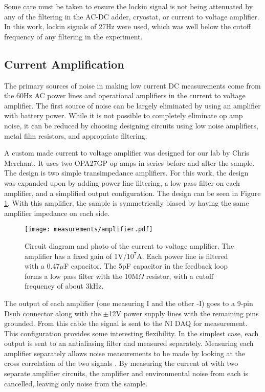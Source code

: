 Some care must be taken to ensure the lockin signal is not being attenuated by any of the filtering in the AC-DC adder, cryostat, or current to voltage amplifier.  In this work, lockin signals of 27Hz were used, which was well below the cutoff frequency of any filtering in the experiment.

\subsection{Current Amplification}
\label{sec:CV_amp}

The primary sources of noise in making low current DC measurements come from the 60Hz AC power lines and operational amplifiers in the current to voltage amplifier. The first source of noise can be largely eliminated by using an amplifier with battery power. While it is not possible to completely eliminate op amp noise, it can be reduced by choosing designing circuits using low noise amplifiers, metal film resistors, and appropriate filtering. 

A custom made current to voltage amplifier was designed for our lab by Chris Merchant. It uses two OPA27GP op amps in series before and after the sample. The design is two simple transimpedance amplifiers. For this work, the design was expanded upon by adding power line filtering, a low pass filter on each amplifier, and a simplified output configuration. The design can be seen in Figure \ref{fig:current_amp}. With this amplifier, the sample is symmetrically biased by having the same amplifier impedance on each side.

\begin{figure}
    \centering
    \texttt{[image: measurements/amplifier.pdf]}
    \caption{Circuit diagram and photo of the current to voltage amplifier. The amplifier has a fixed gain of 1V/$10^7$A. Each power line is filtered with a 0.47$\mu$F capacitor. The 5pF capacitor in the feedback loop forms a low pass filter with the 10M$\Omega$ resistor, with a cutoff frequency of about 3kHz.}
    \label{fig:current_amp}
\end{figure}

The output of each amplifier (one measuring I and the other -I) goes to a 9-pin Dsub connector along with the $\pm$12V power supply lines with the remaining pins grounded. From this cable the signal is sent to the NI DAQ for measurement. This configuration provides some interesting flexibility. In the simplest case, each output is sent to an antialiasing filter and measured separately. Measuring each amplifier separately allows noise measurements to be made by looking at the cross correlation of the two signals \cite{Merchant2009}. By measuring the current at with two separate amplifier circuits, the amplifier and environmental noise from each is cancelled, leaving only noise from the sample.

